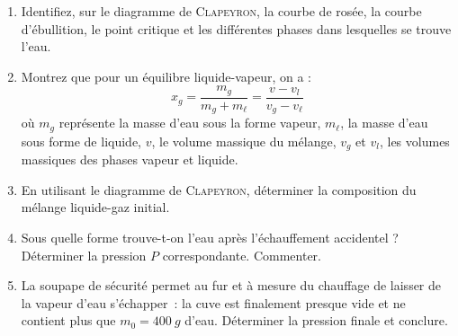 \documentclass[a4paper, 10pt, final, garamond]{book}
\begin{document}
\begin{enumerate}
	\item Identifiez, sur le diagramme de \textsc{Clapeyron}, la courbe de rosée,
	      la courbe d'ébullition, le point critique et les différentes phases dans
	      lesquelles se trouve l'eau.

	\item Montrez que pour un équilibre liquide-vapeur, on a :
	      \[
		      x_g = \frac{m_g}{m_g+m_{\ell}} = \frac{v-v_l}{v_g - v_{\ell}}
	      \]
	      où $m_g$ représente la masse d'eau sous la forme vapeur, $m_{\ell}$, la masse
	      d'eau sous forme de liquide, $v$, le volume massique du mélange, $v_g$ et
	      $v_l$, les volumes massiques des phases vapeur et liquide.

	\item En utilisant le diagramme de \textsc{Clapeyron}, déterminer la
	      composition du mélange liquide-gaz initial.

	\item Sous quelle forme trouve-t-on l'eau après l'échauffement accidentel ?
	      Déterminer la pression $P$ correspondante. Commenter.

	\item La soupape de sécurité permet au fur et à mesure du chauffage de laisser
	      de la vapeur d'eau s'échapper~: la cuve est finalement presque vide et ne
	      contient plus que $m_0 = \SI{400}{g}$ d'eau. Déterminer la pression
	      finale et conclure.
\end{enumerate}
\end{document}
